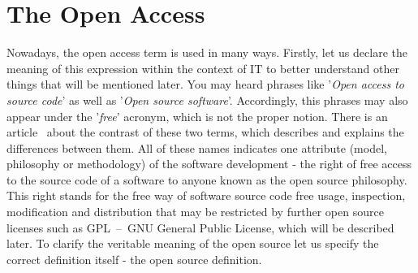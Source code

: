\documentclass[12pt,a4paper]{article}
\theoremstyle{definition}
\begin{document}
\section{The Open Access}

    Nowadays, the open access term is used in many ways. Firstly, let us declare the meaning of this expression within the context of IT to better understand other things that will be mentioned later. You may heard phrases like '\textit{Open access to source code}' as well as '\textit{Open source software}'. Accordingly, this phrases may also appear under the '\textit{free}' acronym, which is not the proper notion. There is an article~\cite{WP:free-vs-open-source} about the contrast of these two terms, which describes and explains the differences between them. All of these names indicates one attribute (model, philosophy or methodology) of the software development - the right of free access to the source code of a software to anyone known as the open source philosophy. This right stands for the free way of software source code free usage, inspection, modification and distribution that may be restricted by further open source licenses such as GPL~--~GNU General Public License, which will be described later. To clarify the veritable meaning of the open source let us specify the correct definition itself - the open source definition.\\[-3mm]
\end{document}
